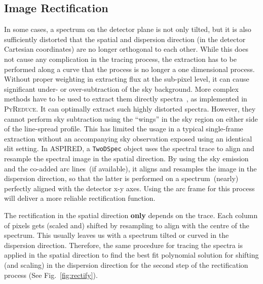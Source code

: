 \documentclass[linenumbers, twocolumn]{aastex631}
\begin{document}
\subsection{Image Rectification}
In some cases, a spectrum on the detector plane is not only tilted, but it is
also sufficiently distorted that the spatial and dispersion direction (in the
detector Cartesian coordinates) are no longer orthogonal to each other. While
this does not cause any complication in the tracing process, the extraction has
to be performed along a curve that the process is no longer a one dimensional
process. Without proper weighting in extracting flux at the sub-pixel level,
it can cause significant under- or over-subtraction of the sky background. More
complex methods have to be used to extract them directly
spectra~\citep[e.g.][]{2021A&A...646A..32P}, as implemented
in \textsc{PyReduce}. It can optimally extract such highly distorted spectra.
However, they cannot perform sky subtraction using the ``wings'' in the sky
region on either side of the line-spread profile. This has limited the usage
in a typical single-frame extraction without an accompanying sky observation
exposed using an identical slit setting. In \textsc{ASPIRED}, a
\texttt{TwoDSpec} object uses the spectral trace to align and resample the
spectral image in the spatial direction. By using the sky emission and the
co-added arc lines~(if available), it aligns and resamples the image in the
dispersion direction, so that the latter is performed on a spectrum~(nearly)
perfectly aligned with the detector x-y axes. Using the arc frame for this
process will deliver a more reliable rectification function.

The rectification in the spatial direction \textbf{only} depends on the trace.
Each column of pixels gets (scaled and) shifted by resampling to align with the
centre of the spectrum. This usually leaves us with a spectrum tilted or curved
in the dispersion direction. Therefore, the same procedure for tracing the
spectra is applied in the spatial direction to find the best fit polynomial
solution for shifting (and scaling) in the dispersion direction for the second
step of the rectification process (See Fig.~\ref{fig:rectify}).
\end{document}
